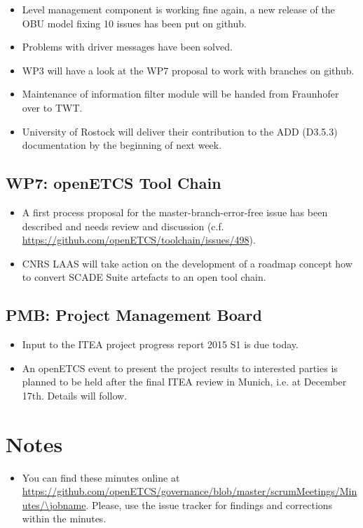 \documentclass[a4paper, 11pt]{article}
\begin{document}
\begin{itemize}
\item Level management component is working fine again, a new release of the OBU model fixing 10 issues has been put on github.
\item Problems with driver messages have been solved.
\item WP3 will have a look at the WP7 proposal to work with branches on github.
\item Maintenance of information filter module will be handed from Fraunhofer over to TWT.
\item University of Rostock will deliver their contribution to the ADD (D3.5.3) documentation by the beginning of next week.
\end{itemize}

\subsection{WP7: openETCS Tool Chain}

\begin{itemize}
\item A first process proposal for the master-branch-error-free issue has been described and needs review and discussion (c.f. \url{https://github.com/openETCS/toolchain/issues/498}).
\item CNRS LAAS will take action on the development of a roadmap concept how to convert SCADE Suite artefacts to an open tool chain.
\end{itemize}

\subsection{PMB: Project Management Board}

\begin{itemize}
\item Input to the ITEA project progress report 2015 S1 is due today.
\item An openETCS event to present the project results to interested parties is planned to be held after the final ITEA review in Munich, i.e. at December 17th. Details will follow.
\end{itemize}

\section{Notes}


\begin{itemize}
\item You can find these minutes online at \url{https://github.com/openETCS/governance/blob/master/scrumMeetings/Minutes/\jobname}. Please, use the issue tracker for findings and corrections within the minutes.
\end{itemize}
\end{document}

